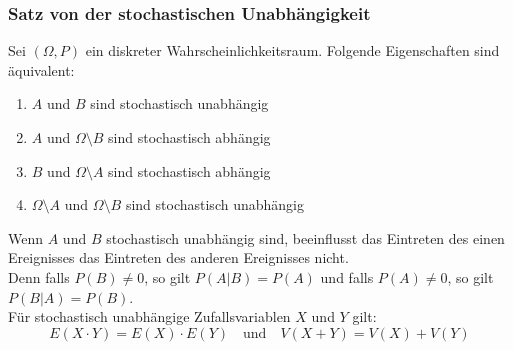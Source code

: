 \subsubsection{Satz von der stochastischen Unabhängigkeit}
\label{sec:satz-von-der-stochastischen-unabhngigkeit}
Sei $(\Omega, P)$ ein diskreter Wahrscheinlichkeitsraum. Folgende Eigenschaften sind äquivalent:
\begin{enumerate}
    \item $A$ und $B$ sind stochastisch unabhängig
    \item $A$ und $\Omega \setminus B$ sind stochastisch abhängig
    \item $B$ und $\Omega \setminus A$ sind stochastisch abhängig
    \item $\Omega \setminus A$ und $\Omega \setminus B$ sind stochastisch unabhängig
\end{enumerate}
Wenn $A$ und $B$ stochastisch unabhängig sind, beeinflusst das Eintreten des einen Ereignisses das Eintreten
des anderen Ereignisses nicht. \\
Denn falls $P(B) \neq 0$, so gilt $P(A|B) = P(A)$ und falls $P(A) \neq 0$, so gilt $P(B|A) = P(B)$. \\
Für stochastisch unabhängige Zufallsvariablen $X$ und $Y$ gilt:
\begin{equation*}
    E(X \cdot Y) = E(X) \cdot E(Y) \quad \text{und} \quad V(X + Y) = V(X) + V(Y)
\end{equation*}